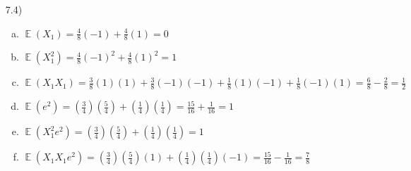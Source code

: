 \documentclass{article}
\newcommand{\pfrac}[2]{\left(\frac{#1}{#2}\right)}
\DeclareMathOperator{\E}{\mathbb{E}}%
\begin{document}
\begin{itemize}
	\item[7.4)] 
		\begin{enumerate}[(a)]
			\item $ \E(X_1) = \frac{4}{8}(-1) + \frac{4}{8}(1) = 0 $
			\item $ \E(X_1^2) =  \frac{4}{8}(-1)^2 + \frac{4}{8}(1)^2 = 1  $
			\item $ \E(X_1X_1) = \frac{3}{8}(1)(1) + \frac{3}{8}(-1)(-1) + \frac{1}{8}(1)(-1) + \frac{1}{8}(-1)(1) = \frac{6}{8} - \frac{2}{8} = \frac{1}{2} $
			\item $ \E(e^2) = \pfrac{3}{4}\left(\frac{5}{4}\right) + \pfrac{1}{4}\left(\frac{1}{4}\right) = \frac{15}{16} + \frac{1}{16} = 1 $
			\item $ \E(X_1^2e^2) = \pfrac{3}{4}\left(\frac{5}{4}\right) + \pfrac{1}{4}\left(\frac{1}{4}\right) = 1  $
			\item $ \E(X_1X_1e^2) = \pfrac{3}{4}\pfrac{5}{4}(1) + \pfrac{1}{4}\pfrac{1}{4}(-1) = \frac{15}{16} - \frac{1}{16} = \frac{7}{8} $
		\end{enumerate}
	
\end{itemize}

\pagebreak
\end{document}
